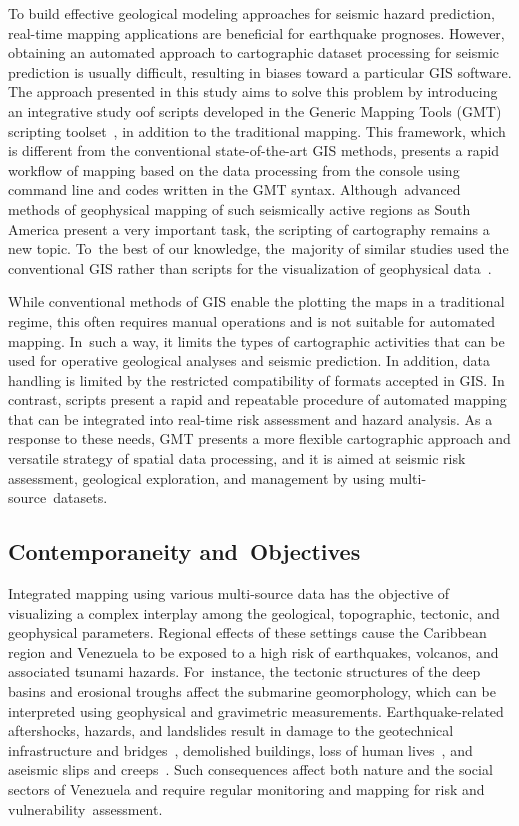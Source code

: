 \documentclass[sustainability,article,accept,pdftex,moreauthors]{Definitions/mdpi}
\begin{document}
To build{ }effective geological{ }modeling{ approaches }for seismic hazard prediction,{ }real-time mapping applications{ are beneficial for earthquake} prognoses{. }However, obtaining an {automated approach to }cartographic dataset {processing }for seismic prediction{ is usually difficult, resulting in biases toward a particular GIS software. }The approach presented in this study aims to solve {this }problem{ }by introducing an integrative study oof scripts developed in the Generic Mapping Tools (GMT) scripting toolset~\cite{Wessel},{ in addition to the traditional mapping}. This framework, which is different from the {conventional state-of-the-art } GIS {methods}, presents a {rapid workflow of} mapping {based on the data processing from the} console using{ }command line and codes written in the GMT syntax. Although~{advanced methods of }geophysical mapping  of such seismically active regions as South America {present }a very important task, {the scripting of cartography remains }a  new topic. To~the best of our knowledge, the~majority of similar studies used the conventional GIS rather than scripts for the visualization of {geophysical }data~\cite{Castillo}{.}

While conventional methods of GIS enable the plotting the maps in a traditional regime, this often requires manual operations and is not suitable for automated mapping. In~such a way, it limits the types of cartographic activities that can be used for operative geological analyses and seismic prediction. In addition, data handling is limited by {the }restricted compatibility of formats accepted in GIS{. }In contrast, scripts present a rapid and repeatable procedure of automated mapping that can be integrated {into }real-time risk assessment and hazard analysis. {As a response to these needs, }GMT presents a more flexible {cartographic }approach and{ }versatile strategy of {spatial }data processing, and it is aimed at {seismic }risk assessment{, geological exploration, and }management by using multi-source~datasets. 

\subsection{Contemporaneity and~Objectives}

Integrated mapping using various multi-source data has the objective of visualizing a complex interplay among the geological, topographic, tectonic, and geophysical{ parameters. Regional effects of these settings cause }the Caribbean region and{ }Venezuela to be exposed to a high risk of earthquakes,{ }volcanos, and associated tsunami hazards. For~instance, the tectonic structures{ of the }deep basins and erosional troughs affect the submarine geomorphology,{ }which can be interpreted using geophysical and gravimetric measurements{. }Earthquake-related aftershocks, hazards, and{ }landslides {result in  damage to the }geotechnical infrastructure and bridges~\cite{Salcedo}, demolished buildings{, }loss of human lives~\cite{Rodriguez2018}, and aseismic slips and creeps~\cite{Pousse2016}{. Such consequences }affect both nature and the social {sectors }of Venezuela and require regular monitoring {and} mapping{ for }risk and vulnerability~assessment. 
\end{document}
